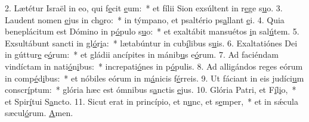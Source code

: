 2. Lætétur Israël in eo, qui f\uline{e}cit \uline{e}um:~* et fílii Sion exsúltent in r\uline{e}ge s\uline{u}o.
3. Laudent nomen \uline{e}jus in ch\uline{o}ro:~* in týmpano, et psaltério ps\uline{a}llant \uline{e}i.
4. Quia beneplácitum est Dómino in p\uline{ó}pulo s\uline{u}o:~* et exaltábit mansuétos \uline{i}n sal\uline{ú}tem.
5. Exsultábunt sancti in gl\uline{ó}r\uline{i}a:~* lætabúntur in cub\uline{í}libus s\uline{u}is.
6. Exaltatiónes Dei in gúttur\uline{e} e\uline{ó}rum:~* et gládii ancípites in mánib\uline{u}s e\uline{ó}rum.
7. Ad faciéndam vindíctam in nati\uline{ó}n\uline{i}bus:~* increpati\uline{ó}nes in p\uline{ó}pulis.
8. Ad alligándos reges eórum in comp\uline{é}d\uline{i}bus:~* et nóbiles eórum in m\uline{á}nicis f\uline{é}rreis.
9. Ut fáciant in eis judíci\uline{u}m conscr\uline{í}ptum:~* glória hæc est ómnibus s\uline{a}nctis \uline{e}jus.
10. Glória Patri, et F\uline{í}l\uline{i}o,~* et Spir\uline{í}tui S\uline{a}ncto.
11. Sicut erat in princípio, et n\uline{u}nc, et s\uline{e}mper,~* et in sǽcula sæcul\uline{ó}rum. \uline{A}men.
